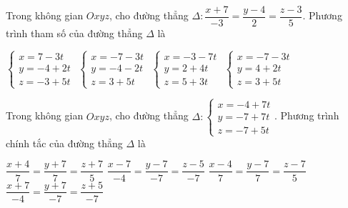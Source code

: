 \documentclass[12pt,a4paper]{article}
\begin{document}
\begin{ex}
 Trong không gian ${Oxyz}$, cho đường thẳng ${\Delta}: \dfrac{x + 7}{-3}=\dfrac{y - 4}{2}=\dfrac{z - 3}{5}$. Phương trình tham số của đường thẳng ${\Delta}$ là
 
\choice
{ $\left\{ \begin{array}{l}x = 7-3t\\ y = -4+2t\\z = -3+5t\end{array} \right.$ }
   { $\left\{ \begin{array}{l}x = -7-3t\\ y = -4-2t\\z = 3+5t\end{array} \right.$ }
     { $\left\{ \begin{array}{l}x = -3-7t\\ y = 2+4t\\z = 5+3t\end{array} \right.$ }
    { \True $\left\{ \begin{array}{l}x = -7-3t\\ y = 4+2t\\z = 3+5t\end{array} \right.$ }
\end{ex}

\begin{ex}
 Trong không gian ${Oxyz}$, cho đường thẳng ${\Delta}:\left\{ \begin{array}{l}x = -4+7t\\ y = -7+7t\\z = -7+5t\end{array} \right.$. Phương trình chính tắc của đường thẳng ${\Delta}$ là
 
\choice
{ \True $\dfrac{x + 4}{7}=\dfrac{y + 7}{7}=\dfrac{z + 7}{5}$ }
   { $\dfrac{x - 7}{-4}=\dfrac{y - 7}{-7}=\dfrac{z - 5}{-7}$ }
     { $\dfrac{x - 4}{7}=\dfrac{y - 7}{7}=\dfrac{z - 7}{5}$ }
    { $\dfrac{x + 7}{-4}=\dfrac{y + 7}{-7}=\dfrac{z + 5}{-7}$ }
\end{ex}
\end{document}
